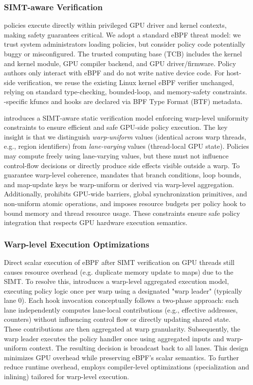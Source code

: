 \subsubsection{SIMT-aware Verification}

\sys policies execute directly within privileged GPU driver and kernel contexts, making safety guarantees critical. We adopt a standard eBPF threat model: we trust system administrators loading policies, but consider policy code potentially buggy or misconfigured. The trusted computing base (TCB) includes the kernel and \sys kernel module, GPU compiler backend, and GPU driver/firmware. Policy authors only interact with eBPF and do not write native device code. For host-side verification, we reuse the existing Linux kernel eBPF verifier unchanged, relying on standard type-checking, bounded-loop, and memory-safety constraints. \sys-specific kfuncs and hooks are declared via BPF Type Format (BTF) metadata.

\sys introduces a SIMT-aware static verification model enforcing warp-level uniformity constraints to ensure efficient and safe GPU-side policy execution.
The key insight is that we distinguish \emph{warp-uniform} values (identical across warp threads, e.g., region identifiers) from \emph{lane-varying} values (thread-local GPU state). Policies may compute freely using lane-varying values, but these must not influence control-flow decisions or directly produce side effects visible outside a warp. To guarantee warp-level coherence, \sys mandates that branch conditions, loop bounds, and map-update keys be warp-uniform or derived via warp-level aggregation. Additionally, \sys prohibits GPU-wide barriers, global synchronization primitives, and non-uniform atomic operations, and imposes resource budgets per policy hook to bound memory and thread resource usage. These constraints ensure safe policy integration that respects GPU hardware execution semantics.

\subsubsection{Warp-level Execution Optimizations}

Direct scalar execution of eBPF after SIMT verification on GPU threads still causes resource overhead (e.g. duplicate memory update to maps) due to the SIMT. To resolve this, \sys introduces a warp-level aggregated execution model, executing policy logic once per warp using a designated "warp leader" (typically lane 0). Each hook invocation conceptually follows a two-phase approach: each lane independently computes lane-local contributions (e.g., effective addresses, counters) without influencing control flow or directly updating shared state. These contributions are then aggregated at warp granularity. Subsequently, the warp leader executes the policy handler once using aggregated inputs and warp-uniform context. The resulting decision is broadcast back to all lanes. This design minimizes GPU overhead while preserving eBPF's scalar semantics. To further reduce runtime overhead, \sys employs compiler-level optimizations (specialization and inlining) tailored for warp-level execution.

